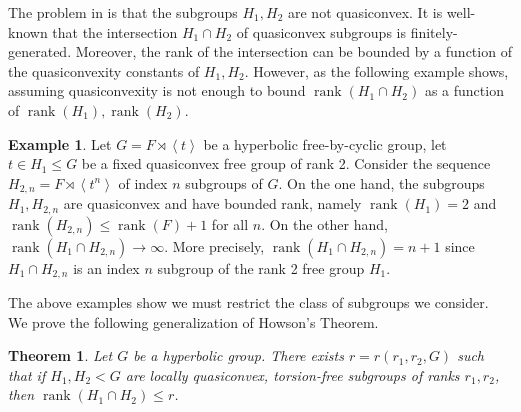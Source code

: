 \documentclass[article, 12pt]{amsart}
\numberwithin{equation}{section}
\newtheorem{theoremA}{Theorem}
\theoremstyle{definition}
\newtheorem{example}[theorem]{Example}
\newcommand{\gen}[1]{\left< #1 \right>}
\DeclareMathOperator{\rank}{rank}
\begin{document}
The problem in  is that the subgroups $H_1,H_2$ are not quasiconvex.
It is well-known that the intersection $H_1\cap H_2$ of quasiconvex subgroups is finitely-generated. 
Moreover, the rank of the intersection can be bounded by a function of the quasiconvexity constants of $H_1, H_2$. 
However, as the following example shows, assuming quasiconvexity is not enough to bound $\rank(H_1\cap H_2)$ as a function of $\rank(H_1),\rank(H_2)$.

\begin{example}\label{example: cyclic cover}
    Let $G=F \rtimes \gen{t}$ be a hyperbolic free-by-cyclic group,
    let $t\in H_1\le G$ be a fixed quasiconvex free group of rank 2. 
    Consider the sequence $H_{2,n} = F\rtimes \gen{t^n}$ of index $n$ subgroups of $G$.
    On the one hand, the subgroups $H_1,H_{2,n}$ are quasiconvex and have bounded rank, namely $\rank(H_1)=2$ and $\rank(H_{2,n})\le \rank(F)+1$ for all $n$. On the other hand, $\rank(H_1\cap H_{2,n}) \to \infty$. 
    More precisely, $\rank(H_1\cap H_{2,n})= n+1$ since $H_1\cap H_{2,n}$ is an index $n$ subgroup of the rank 2 free group $H_1$.
\end{example}


The above examples show we must restrict the class of subgroups we consider.
We prove the following generalization of Howson's Theorem.

\begin{theoremA}\label{main thm}
    Let $G$  be a hyperbolic group. 
    There exists $r=r(r_1,r_2,G)$ such that if $H_1,H_2<G$ are locally quasiconvex, torsion-free subgroups of ranks $r_1,r_2$, then 
    $\rank(H_1\cap H_2)\le r$.
    
\end{theoremA}



\end{document}
